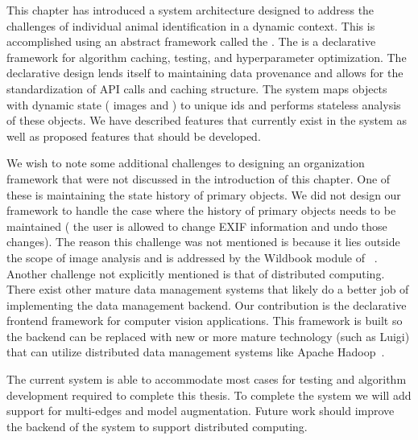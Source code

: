         This chapter has introduced a system architecture designed to address
          the challenges of individual animal identification in a dynamic
          context.
        This is accomplished using an abstract framework called the
          \depcache{}.
        The \depcache{} is a declarative framework for algorithm caching,
          testing, and hyperparameter optimization.
        The declarative design lends itself to maintaining data provenance and
          allows for the standardization of API calls and caching structure.
        The system maps objects with dynamic state (\eg{} images and
          \annots{}) to unique ids and performs stateless analysis of these
          objects.
        We have described features that currently exist in the system as well
          as proposed features that should be developed.

        We wish to note some additional challenges to designing an
          organization framework that were not discussed in the introduction of
          this chapter.
        One of these is maintaining the state history of primary objects.
        We did not design our framework to handle the case where the history
          of primary objects needs to be maintained (\ie{} the user is allowed
          to change EXIF information and undo those changes).
        The reason this challenge was not mentioned is because it  lies
          outside the scope of image analysis and is addressed by the Wildbook
          module of \IBEIS{}~\cite{j_bonner_markrecapture_2013}.
        Another challenge not explicitly mentioned is that of distributed
          computing.
        There exist other mature data management systems that likely do a
          better job of implementing the data management backend.
        Our contribution is the declarative frontend framework for computer
          vision applications.
        This framework is built so the backend can be replaced with new or
          more mature technology (such as Luigi) that can utilize distributed
          data management systems like Apache
          Hadoop~\cite{shvachko_hadoop_2010}.

        The current system is able to accommodate most cases for testing and
          algorithm development required to complete this thesis.
        To complete the system we will add support for multi-edges and model
          augmentation.
        Future work should improve the backend of the system to support
          distributed computing.

